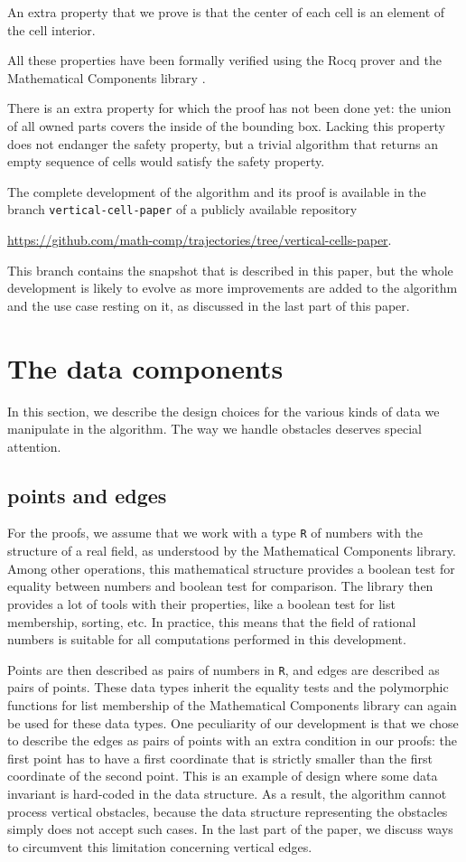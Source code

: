 \documentclass[a4paper, USenglish, cleveref, autoref, thm-restate, final]{lipics-v2021}
\begin{document}
An extra property that we prove is that the center of each cell is an
element of the cell interior.

All these properties have been formally verified using the
Rocq prover and the {\sc Mathematical Components} library
\cite{assia_mahboubi_2022_7118596}.

There is an extra property for which the proof has not been done yet:
the union of all owned parts covers the inside of the bounding box.  Lacking
this property does not endanger the safety property, but a trivial algorithm
that returns an empty sequence of cells would satisfy the safety property.

The complete development of the algorithm and its proof is available
in the branch {\tt vertical-cell-paper} of a publicly
available repository
\begin{center}
\url{https://github.com/math-comp/trajectories/tree/vertical-cells-paper}.
\end{center}
This branch contains the snapshot that is described in this paper, but
the whole development is likely to evolve as more improvements are
added to the algorithm and the use case resting on it, as discussed in the
last part of this paper.

\section{The data components}
In this section, we describe the design choices for the various kinds
of data we manipulate in the algorithm.  The way we handle obstacles
deserves special attention.
\subsection{points and edges}

For the proofs, we assume that we work with a type {\tt R} of numbers
with the structure of a real field, as understood by the
{\sc Mathematical Components} library.  Among other operations, this
mathematical structure provides a boolean test for equality between
numbers and boolean test for comparison.  The library then provides a
lot of tools with their properties, like a boolean test for list
membership, sorting, etc.  In practice, this means that
the field of rational numbers is suitable for all computations
performed in this development.

Points are then described as pairs of numbers in {\tt R}, and edges
are described as pairs of points.  These data types inherit the
equality tests and the polymorphic functions for list membership of
the {\sc Mathematical Components} library can again be used for these
data types.  One peculiarity of our development
is that we chose to describe the edges as pairs of points with an extra
condition in our proofs: the first point has to have a first
coordinate that is strictly smaller than the first coordinate of the
second point.  This is an example of design where some data invariant
is hard-coded in the data structure.  As a result, the algorithm
cannot process vertical obstacles, because the data structure
representing the obstacles simply does not accept such cases.  In the
last part of the paper, we discuss ways to circumvent this limitation
concerning vertical edges.
\end{document}
